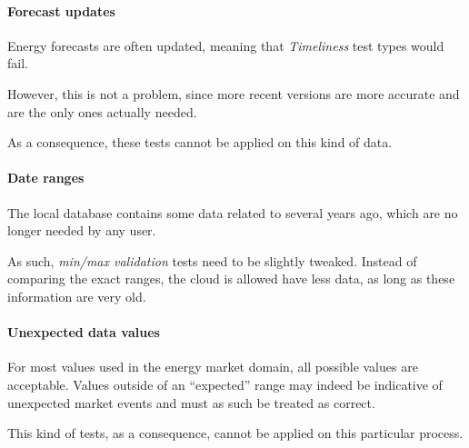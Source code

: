     \paragraph{Forecast updates}
        Energy forecasts are often updated, meaning that \textit{Timeliness} test types would fail.
        
        However, this is not a problem, since more recent versions are more accurate and are the only ones actually needed.
        
        As a consequence, these tests cannot be applied on this kind of data.
    
    \paragraph{Date ranges}
        The local database contains some data related to several years ago, which are no longer needed by any user.
        
        As such, \textit{min/max validation} tests need to be slightly tweaked.
        Instead of comparing the exact ranges, the cloud is allowed have less data, as long as these information are very old.
        
    \paragraph{Unexpected data values}
        For most values used in the energy market domain, all possible values are acceptable.
        Values outside of an ``expected'' range may indeed be indicative of unexpected market events and must as such be treated as correct.
        
        This kind of tests, as a consequence, cannot be applied on this particular process.

    